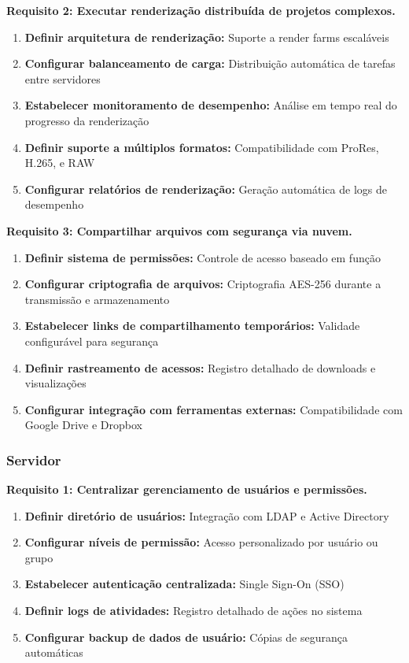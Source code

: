 \textbf{Requisito 2: Executar renderização distribuída de projetos complexos.}
\begin{enumerate}[leftmargin=*]
    \item \textbf{Definir arquitetura de renderização:} Suporte a render farms escaláveis
    \item \textbf{Configurar balanceamento de carga:} Distribuição automática de tarefas entre servidores
    \item \textbf{Estabelecer monitoramento de desempenho:} Análise em tempo real do progresso da renderização
    \item \textbf{Definir suporte a múltiplos formatos:} Compatibilidade com ProRes, H.265, e RAW
    \item \textbf{Configurar relatórios de renderização:} Geração automática de logs de desempenho
\end{enumerate}

\textbf{Requisito 3: Compartilhar arquivos com segurança via nuvem.}
\begin{enumerate}[leftmargin=*]
    \item \textbf{Definir sistema de permissões:} Controle de acesso baseado em função
    \item \textbf{Configurar criptografia de arquivos:} Criptografia AES-256 durante a transmissão e armazenamento
    \item \textbf{Estabelecer links de compartilhamento temporários:} Validade configurável para segurança
    \item \textbf{Definir rastreamento de acessos:} Registro detalhado de downloads e visualizações
    \item \textbf{Configurar integração com ferramentas externas:} Compatibilidade com Google Drive e Dropbox
\end{enumerate}

\subsubsection{Servidor}
\textbf{Requisito 1: Centralizar gerenciamento de usuários e permissões.}
\begin{enumerate}[leftmargin=*]
    \item \textbf{Definir diretório de usuários:} Integração com LDAP e Active Directory
    \item \textbf{Configurar níveis de permissão:} Acesso personalizado por usuário ou grupo
    \item \textbf{Estabelecer autenticação centralizada:} Single Sign-On (SSO)
    \item \textbf{Definir logs de atividades:} Registro detalhado de ações no sistema
    \item \textbf{Configurar backup de dados de usuário:} Cópias de segurança automáticas
\end{enumerate}

